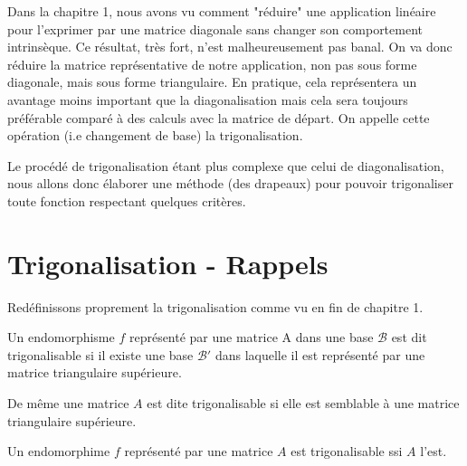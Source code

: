 

\justify 

\setlength{\parindent}{0pt}



\minitoc  %

Dans la chapitre 1, nous avons vu comment "réduire" une application linéaire pour l'exprimer par une matrice diagonale 
sans changer son comportement intrinsèque. Ce résultat, très fort, n'est malheureusement pas banal. 
On va donc réduire la matrice représentative de notre application, non pas sous forme diagonale, mais sous forme triangulaire. 
En pratique, cela représentera un avantage moins important que la diagonalisation mais cela sera toujours préférable
comparé à des calculs avec la matrice de départ. On appelle cette opération (i.e changement de base) la trigonalisation. 

Le procédé de trigonalisation étant plus complexe que celui de diagonalisation, nous allons donc élaborer une méthode (des drapeaux)
pour pouvoir trigonaliser toute fonction respectant quelques critères. 



\section{Trigonalisation - Rappels}

Redéfinissons proprement la trigonalisation comme vu en fin de chapitre 1. 

\begin{definition}[Trigonalisation]
    Un endomorphisme $f$ représenté par une matrice A dans une base $\mathcal{B}$ est dit trigonalisable si 
    il existe une base $\mathcal{B}'$ dans laquelle il est représenté par une matrice triangulaire supérieure. 

    \vspace{0.3cm}

    De même une matrice $A$ est dite trigonalisable si elle est semblable à une matrice triangulaire supérieure. 
\end{definition}

\begin{prop}
    Un endomorphime $f$ représenté par une matrice $A$ est trigonalisable ssi $A$ l'est. 
\end{prop}

